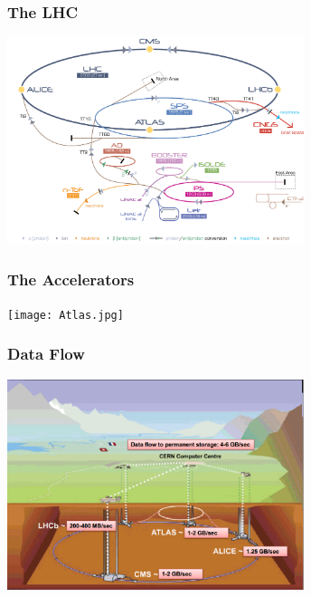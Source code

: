 \documentclass[aspectratio=169]{beamer}
\begin{document}

\begin{frame}
    \frametitle{The LHC}
    \begin{center}
    \includegraphics[width=0.65\textwidth,trim=4 4 4 4,clip]{Cern-Accelerator-Complex2.jpg}
\end{center}
\end{frame}


\begin{frame}
    \frametitle{The Accelerators}
    \begin{center}
    \texttt{[image: Atlas.jpg]}
    \end{center}
\end{frame}


\begin{frame}
    \frametitle{Data Flow}
    \begin{center}
    \includegraphics[width=0.65\textwidth,trim=4 4 4 4,clip]{LHC_DataFlow.png}
    \end{center}
\end{frame}

\end{document}
